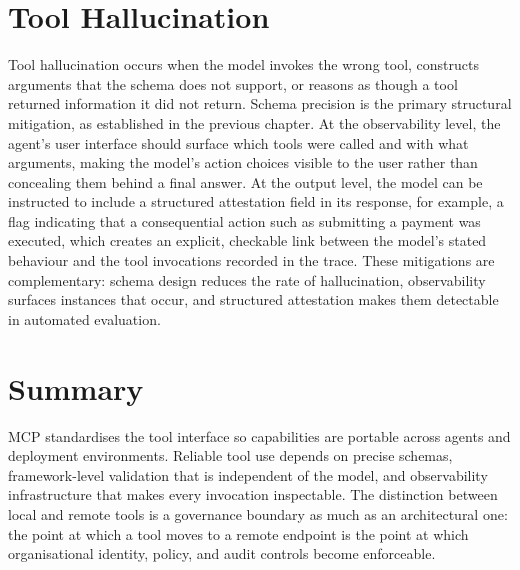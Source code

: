 \section{Tool Hallucination}

Tool hallucination occurs when the model invokes the wrong tool, constructs arguments
that the schema does not support, or reasons as though a tool returned information it did
not return. Schema precision is the primary structural mitigation, as established in the
previous chapter. At the observability level, the agent's user interface should surface
which tools were called and with what arguments, making the model's action choices
visible to the user rather than concealing them behind a final answer. At the output
level, the model can be instructed to include a structured attestation field in its
response, for example, a flag indicating that a consequential action such as submitting
a payment was executed, which creates an explicit, checkable link between the model's
stated behaviour and the tool invocations recorded in the trace. These mitigations are
complementary: schema design reduces the rate of hallucination, observability surfaces
instances that occur, and structured attestation makes them detectable in automated
evaluation.

\section{Summary}

MCP standardises the tool interface so capabilities are portable across agents and
deployment environments. Reliable tool use depends on precise schemas, framework-level
validation that is independent of the model, and observability infrastructure that makes
every invocation inspectable. The distinction between local and remote tools is a
governance boundary as much as an architectural one: the point at which a tool moves to
a remote endpoint is the point at which organisational identity, policy, and audit
controls become enforceable.
